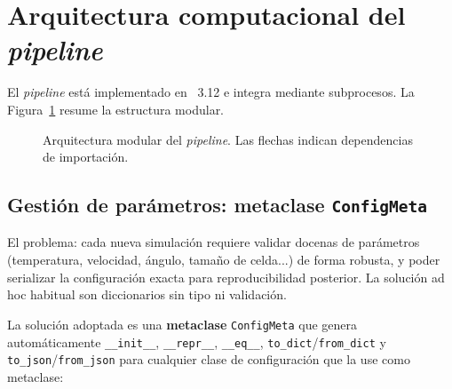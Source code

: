 \section{Arquitectura computacional del \textit{pipeline}}
\label{sec:arquitectura}

El \textit{pipeline} está implementado en \python{}~3.12 e integra \lammps{}
mediante subprocesos. La Figura~\ref{fig:arquitectura} resume la estructura
modular.

\begin{figure}[ht]
    \centering
    \caption{Arquitectura modular del \textit{pipeline}. Las flechas indican
    dependencias de importación.}
    \label{fig:arquitectura}
\end{figure}

\subsection{Gestión de parámetros: metaclase \texttt{ConfigMeta}}
\label{sec:configmeta}

El problema: cada nueva simulación requiere validar docenas de parámetros
(temperatura, velocidad, ángulo, tamaño de celda...) de forma robusta, y poder
serializar la configuración exacta para reproducibilidad posterior. La solución
ad hoc habitual son diccionarios sin tipo ni validación.

La solución adoptada es una \textbf{metaclase} \verb|ConfigMeta| que genera
automáticamente \verb|__init__|, \verb|__repr__|, \verb|__eq__|,
\verb|to_dict|/\verb|from_dict| y \verb|to_json|/\verb|from_json| para
cualquier clase de configuración que la use como metaclase:

